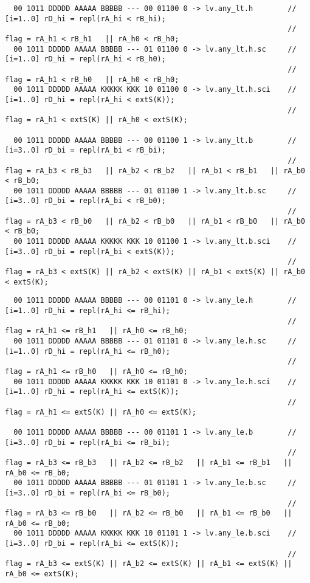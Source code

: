 \begin{landscape}
{\begin{verbatim}
  00 1011 DDDDD AAAAA BBBBB --- 00 01100 0 -> lv.any_lt.h        // [i=1..0] rD_hi = repl(rA_hi < rB_hi);    
                                                                 // flag = rA_h1 < rB_h1   || rA_h0 < rB_h0;
  00 1011 DDDDD AAAAA BBBBB --- 01 01100 0 -> lv.any_lt.h.sc     // [i=1..0] rD_hi = repl(rA_hi < rB_h0);    
                                                                 // flag = rA_h1 < rB_h0   || rA_h0 < rB_h0;
  00 1011 DDDDD AAAAA KKKKK KKK 10 01100 0 -> lv.any_lt.h.sci    // [i=1..0] rD_hi = repl(rA_hi < extS(K));  
                                                                 // flag = rA_h1 < extS(K) || rA_h0 < extS(K);

  00 1011 DDDDD AAAAA BBBBB --- 00 01100 1 -> lv.any_lt.b        // [i=3..0] rD_bi = repl(rA_bi < rB_bi);    
                                                                 // flag = rA_b3 < rB_b3   || rA_b2 < rB_b2   || rA_b1 < rB_b1   || rA_b0 < rB_b0;
  00 1011 DDDDD AAAAA BBBBB --- 01 01100 1 -> lv.any_lt.b.sc     // [i=3..0] rD_bi = repl(rA_bi < rB_b0);    
                                                                 // flag = rA_b3 < rB_b0   || rA_b2 < rB_b0   || rA_b1 < rB_b0   || rA_b0 < rB_b0;
  00 1011 DDDDD AAAAA KKKKK KKK 10 01100 1 -> lv.any_lt.b.sci    // [i=3..0] rD_bi = repl(rA_bi < extS(K));  
                                                                 // flag = rA_b3 < extS(K) || rA_b2 < extS(K) || rA_b1 < extS(K) || rA_b0 < extS(K);
\end{verbatim}

\clearpage
\begin{verbatim}
  00 1011 DDDDD AAAAA BBBBB --- 00 01101 0 -> lv.any_le.h        // [i=1..0] rD_hi = repl(rA_hi <= rB_hi);   
                                                                 // flag = rA_h1 <= rB_h1   || rA_h0 <= rB_h0;
  00 1011 DDDDD AAAAA BBBBB --- 01 01101 0 -> lv.any_le.h.sc     // [i=1..0] rD_hi = repl(rA_hi <= rB_h0);   
                                                                 // flag = rA_h1 <= rB_h0   || rA_h0 <= rB_h0;
  00 1011 DDDDD AAAAA KKKKK KKK 10 01101 0 -> lv.any_le.h.sci    // [i=1..0] rD_hi = repl(rA_hi <= extS(K)); 
                                                                 // flag = rA_h1 <= extS(K) || rA_h0 <= extS(K);

  00 1011 DDDDD AAAAA BBBBB --- 00 01101 1 -> lv.any_le.b        // [i=3..0] rD_bi = repl(rA_bi <= rB_bi);   
                                                                 // flag = rA_b3 <= rB_b3   || rA_b2 <= rB_b2   || rA_b1 <= rB_b1   || rA_b0 <= rB_b0;
  00 1011 DDDDD AAAAA BBBBB --- 01 01101 1 -> lv.any_le.b.sc     // [i=3..0] rD_bi = repl(rA_bi <= rB_b0);   
                                                                 // flag = rA_b3 <= rB_b0   || rA_b2 <= rB_b0   || rA_b1 <= rB_b0   || rA_b0 <= rB_b0;
  00 1011 DDDDD AAAAA KKKKK KKK 10 01101 1 -> lv.any_le.b.sci    // [i=3..0] rD_bi = repl(rA_bi <= extS(K)); 
                                                                 // flag = rA_b3 <= extS(K) || rA_b2 <= extS(K) || rA_b1 <= extS(K) || rA_b0 <= extS(K);



\end{verbatim}}
\end{landscape}
